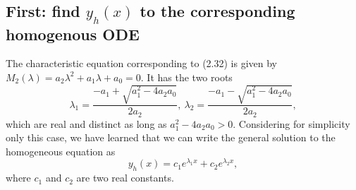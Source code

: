 \documentclass[11pt,a4paper]{article}
\begin{document}
	\subsection*{First: find $y_h(x)$ to the corresponding homogenous ODE}
	The characteristic equation corresponding to (2.32) is given by $M_2(\lambda) = a_2\lambda^2 + a_1\lambda + a_0 = 0$. It has the two roots
	\begin{equation}\label{2.33}
		\lambda_1 = \frac{-a_1+\sqrt{a_1^2-4a_2a_0}}{2a_2},\ \lambda_2 = \frac{-a_1-\sqrt{a_1^2-4a_2a_0}}{2a_2},
	\end{equation}
	which are real and distinct as long as $a_1^2-4a_2a_0 > 0$. Considering for simplicity only this case, we have learned that we can write the general solution to the homogeneous equation as
	\begin{equation}\label{2.34}
		y_h(x) = c_1e^{\lambda_1x} + c_2e^{\lambda_2x},
	\end{equation}
	where $c_1$ and $c_2$ are two real constants.
\end{document}
